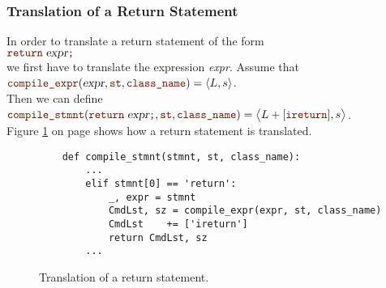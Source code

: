 \subsubsection{Translation of a Return Statement}
In order to translate a return statement of the form
\\[0.2cm]
\hspace*{1.3cm}
$\mytt{return}\; \textsl{expr} \mytt{;}$
\\[0.2cm]
we first have to translate the expression \textsl{expr}.  Assume that
\\[0.2cm]
\hspace*{1.3cm}
$\mytt{compile\_expr}(\textsl{expr}, \mytt{st}, \mytt{class\_name}) = \pair(L, s)$.
\\[0.2cm]
Then we can define
\\[0.2cm]\hspace*{1.3cm}
$\mytt{compile\_stmnt}(\mytt{return}\; \textsl{expr} \mytt{;}, \mytt{st}, \mytt{class\_name}) =
 \bigl\langle L + [\mytt{ireturn}], s \bigr\rangle$.
\\[0.2cm]
Figure \ref{fig:Compiler.ipynb:compile:return} on page \pageref{fig:Compiler.ipynb:compile:return} shows how a
return statement is translated.

\begin{figure}[!ht]
\centering
\begin{verbatim}
    def compile_stmnt(stmnt, st, class_name):
        ...
        elif stmnt[0] == 'return':
            _, expr = stmnt
            CmdLst, sz = compile_expr(expr, st, class_name)
            CmdLst    += ['ireturn']
            return CmdLst, sz
        ...       
\end{verbatim}
\vspace*{-0.3cm}
\caption{Translation of a return statement.}
\label{fig:Compiler.ipynb:compile:return}
\end{figure}

